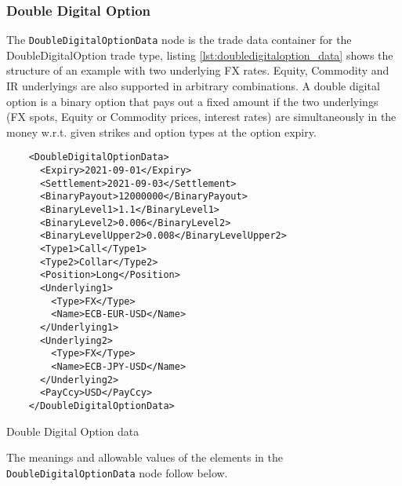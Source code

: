 \subsubsection{Double Digital Option}

The \verb+DoubleDigitalOptionData+ node is the trade data container for the DoubleDigitalOption trade type, listing
\ref{lst:doubledigitaloption_data} shows the structure of an example with two underlying FX rates. Equity, Commodity and IR underlyings are also supported in arbitrary combinations. 
A double digital option is a binary option that pays out a fixed amount if the two underlyings (FX spots, Equity or Commodity prices, interest rates) are simultaneously in the money w.r.t. given strikes and option types at the option expiry.

\begin{listing}[H]
\begin{verbatim}
    <DoubleDigitalOptionData>
      <Expiry>2021-09-01</Expiry>
      <Settlement>2021-09-03</Settlement>
      <BinaryPayout>12000000</BinaryPayout>
      <BinaryLevel1>1.1</BinaryLevel1>
      <BinaryLevel2>0.006</BinaryLevel2>
      <BinaryLevelUpper2>0.008</BinaryLevelUpper2>
      <Type1>Call</Type1>
      <Type2>Collar</Type2>
      <Position>Long</Position>
      <Underlying1>
        <Type>FX</Type>
        <Name>ECB-EUR-USD</Name>
      </Underlying1>
      <Underlying2>
        <Type>FX</Type>
        <Name>ECB-JPY-USD</Name>
      </Underlying2>
      <PayCcy>USD</PayCcy>
    </DoubleDigitalOptionData>
\end{verbatim}
\caption{Double Digital Option data}
\label{lst:doubledigitaloption_data}
\end{listing}

The meanings and allowable values of the elements in the \verb+DoubleDigitalOptionData+  node follow below.

